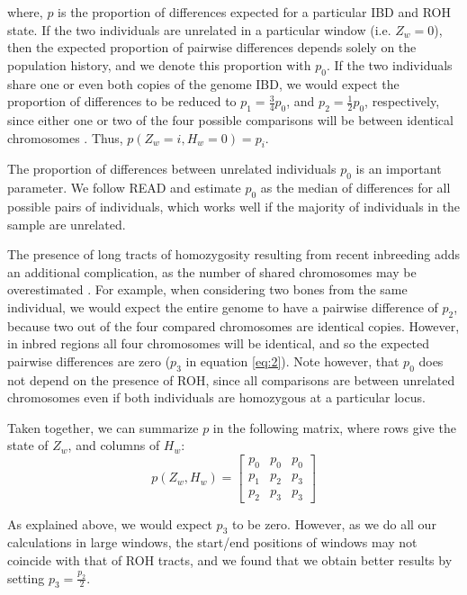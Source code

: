 \documentclass[12pt, letterpaper]{article}
\begin{document}
where, $p$ is the proportion of differences expected for a particular IBD and ROH state. If the two individuals are unrelated in a particular window (i.e. $Z_w = 0$), then the expected proportion of pairwise differences depends solely on the population history, and we denote this proportion with $p_0$. If the two individuals share one or even both copies of the genome IBD, we would expect the proportion of differences to be reduced to $p_1 = \frac{3}{4} p_0$, and $p_2 = \frac{1}2 p_0$, respectively, since either one or two of the four possible comparisons will be between identical chromosomes \cite{kuhn_estimating_2018}. Thus, $p(Z_w=i, H_w=0) = p_i$.

The proportion of differences between unrelated individuals $p_0$ is an important parameter. We follow READ \cite{kuhn_estimating_2018} and estimate $p_0$ as the median of differences for all possible pairs of individuals, which works well if the majority of individuals in the sample are unrelated.

The presence of long tracts of homozygosity resulting from recent inbreeding adds an additional complication, as the number of shared chromosomes may be overestimated \cite{weir_genetic_2006}. For example, when considering two bones from the same individual, we would expect the entire genome to have a pairwise difference of $p_2$, because two out of the four compared chromosomes are identical copies. However, in inbred regions all four chromosomes will be identical, and so the expected pairwise differences are zero ($p_3$ in equation \ref{eq:2}). Note however, that $p_0$ does not depend on the presence of ROH, since all comparisons are between unrelated chromosomes even if both individuals are homozygous at a particular locus. 

Taken together, we can summarize $p$ in the following matrix, where rows give the state of $Z_w$, and columns of $H_w$:
\begin{equation}\label{eq:2}
    p(Z_w, H_w) = \left[\begin{array}
{rrr}
p_0 & p_0 & p_0 \\
p_1 & p_2 & p_3 \\
p_2 & p_3 & p_3
\end{array}\right]
\end{equation}

As explained above, we would expect $p_3$ to be zero. However, as we do all our calculations in large windows, the start/end positions of windows may not coincide with that of ROH tracts, and we found that we obtain better results by setting $p_3 = \frac{p_2}{2}$.
\end{document}
